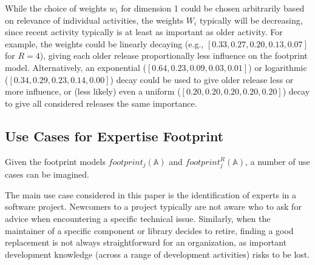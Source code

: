 While the choice of weights $w_i$ for dimension 1 could be chosen arbitrarily based on relevance of individual activities, the weights $W_i$ typically will be decreasing, since recent activity typically is at least as important as older activity. For example, the weights could be linearly decaying (e.g., $[0.33,0.27,0.20,0.13,0.07]$ for $R=4$), giving each older release proportionally less influence on the footprint model. Alternatively, an exponential ($[0.64,0.23,0.09,0.03,0.01]$) or logarithmic ($[0.34,0.29,0.23,0.14,0.00]$) decay could be used to give older release less or more influence, or (less likely) even a uniform ($[0.20,0.20,0.20,0.20,0.20]$) decay to give all considered releases the same importance.%


\subsection{Use Cases for Expertise Footprint}
\label{sec:expertise-formula}

Given the footprint models $footprint_j(\mathbb{A})$ and $footprint_j^R(\mathbb{A})$, a number of use cases can be imagined.

The main use case considered in this paper is the identification of experts in a software project. Newcomers to a project typically are not aware who to ask for advice when encountering a specific technical issue. Similarly, when the maintainer of a specific component or library decides to retire, finding a good replacement is not always straightforward for an organization, as important development knowledge (across a range of development activities) risks to be lost.

